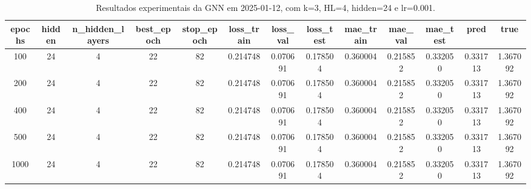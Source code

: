 \begin{table}[h]
\centering
\caption{Resultados experimentais da GNN em 2025-01-12, com k=3, HL=4, hidden=24 e lr=0.001.}
\label{tab:gnn_results_k3_hl4_h24_d20250112}
\begin{tabular}{ccccccccccccc}
\toprule
epochs & hidden & n\_hidden\_layers & best\_epoch & stop\_epoch & loss\_train & loss\_val & loss\_test & mae\_train & mae\_val & mae\_test & pred & true \\
\midrule
100 & 24 & 4 & 22 & 82 & 0.214748 & 0.070691 & 0.178504 & 0.360004 & 0.215852 & 0.332050 & 0.331713 & 1.367092 \\
200 & 24 & 4 & 22 & 82 & 0.214748 & 0.070691 & 0.178504 & 0.360004 & 0.215852 & 0.332050 & 0.331713 & 1.367092 \\
400 & 24 & 4 & 22 & 82 & 0.214748 & 0.070691 & 0.178504 & 0.360004 & 0.215852 & 0.332050 & 0.331713 & 1.367092 \\
500 & 24 & 4 & 22 & 82 & 0.214748 & 0.070691 & 0.178504 & 0.360004 & 0.215852 & 0.332050 & 0.331713 & 1.367092 \\
1000 & 24 & 4 & 22 & 82 & 0.214748 & 0.070691 & 0.178504 & 0.360004 & 0.215852 & 0.332050 & 0.331713 & 1.367092 \\
\bottomrule
\end{tabular}
\end{table}

